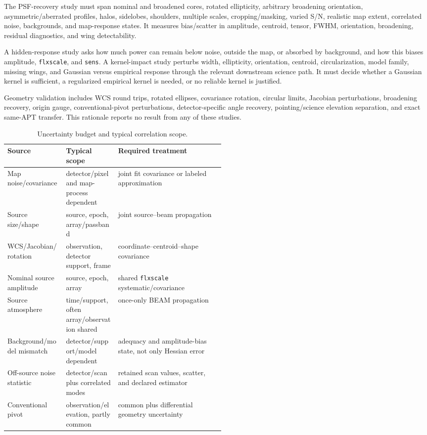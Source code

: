 \documentclass[11pt]{article}
\begin{document}
The PSF-recovery study must span nominal and broadened cores, rotated
ellipticity, arbitrary broadening orientation, asymmetric/aberrated profiles,
halos, sidelobes, shoulders, multiple scales, cropping/masking, varied S/N,
realistic map extent, correlated noise, backgrounds, and map-response states.
It measures bias/scatter in amplitude, centroid, tensor, FWHM, orientation,
broadening, residual diagnostics, and wing detectability.

A hidden-response study asks how much power can remain below noise, outside
the map, or absorbed by background, and how this biases amplitude,
\texttt{flxscale}, and \texttt{sens}. A kernel-impact study perturbs width,
ellipticity, orientation, centroid, circularization, model family, missing
wings, and Gaussian versus empirical response through the relevant downstream
science path. It must decide whether a Gaussian kernel is sufficient, a
regularized empirical kernel is needed, or no reliable kernel is justified.

Geometry validation includes WCS round trips, rotated ellipses, covariance
rotation, circular limits, Jacobian perturbations, broadening recovery, origin
gauge, conventional-pivot perturbations, detector-specific angle recovery,
pointing/science elevation separation, and exact same-APT transfer. This
rationale reports no result from any of these studies.

\begin{table}[ht]\centering\small
\caption{Uncertainty budget and typical correlation scope.}\label{tab:uncertainty}
\begin{tabularx}{\linewidth}{@{}L{0.27\linewidth}L{0.24\linewidth}Y@{}}
\toprule Source & Typical scope & Required treatment \\
\midrule
Map noise/covariance & detector/pixel and map-process dependent & joint fit covariance or labeled approximation \\
Source size/shape & source, epoch, array/passband & joint source--beam propagation \\
WCS/Jacobian/rotation & observation, detector support, frame & coordinate--centroid--shape covariance \\
Nominal source amplitude & source, epoch, array & shared \texttt{flxscale} systematic/covariance \\
Source atmosphere & time/support, often array/observation shared & once-only BEAM propagation \\
Background/model mismatch & detector/support/model dependent & adequacy and amplitude-bias state, not only Hessian error \\
Off-source noise statistic & detector/scan plus correlated modes & retained scan values, scatter, and declared estimator \\
Conventional pivot & observation/elevation, partly common & common plus differential geometry uncertainty \\
\bottomrule
\end{tabularx}
\end{table}
\end{document}
